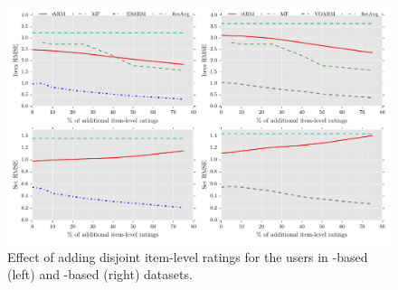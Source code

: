 \begin{figure}[t]
  \centerline{\includegraphics[scale=0.57]{figures/add_items_syn.pdf}}
  \caption{Effect of adding disjoint item-level ratings for the users in \ES-based (left) and \VO-based
  (right) datasets.}
  \label{fig:syn_add_items}
\end{figure}

